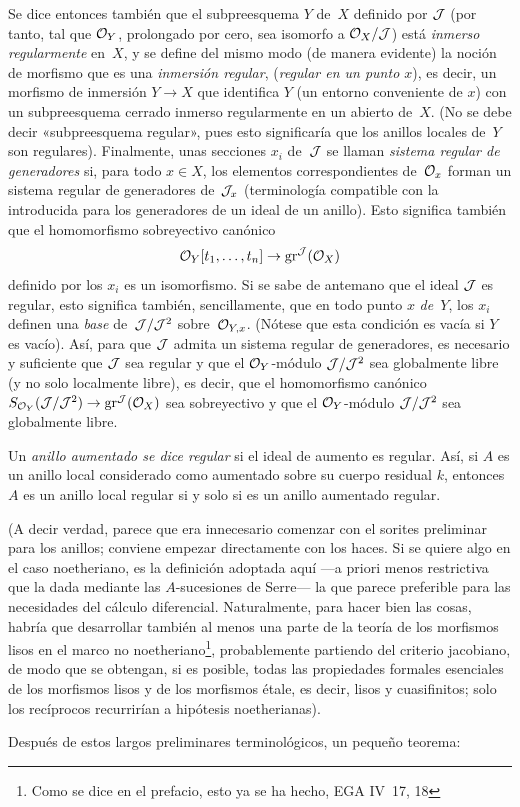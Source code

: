 \begin{remarques}
Se
dice entonces también que el subpreesquema $Y$ de~$X$ definido por $\cal{J}$ (por tanto, tal que $\cal{O}_Y$, prolongado por cero, sea isomorfo a $\cal{O}_X/\cal{J}$) está \emph{inmerso regularmente}
%
en~$X$, y se define del mismo modo (de manera evidente) la noción de morfismo que es una \emph{inmersión regular},
%
%
(\resp \emph{regular en un punto $x$}), es decir, un morfismo de inmersión $Y\to X$ que identifica $Y$ (\resp un entorno conveniente de $x$) con un subpreesquema cerrado inmerso regularmente en un abierto de~$X$. (No se debe decir «subpreesquema regular», pues esto significaría que los anillos locales de~$Y$ son regulares). Finalmente, unas secciones $x_i$ de~$\cal{J}$ se llaman \emph{sistema regular de generadores} si, para todo $x\in X$, los elementos correspondientes de~$\cal{O}_x$ forman un sistema regular de generadores de~$\cal{J}_x$ (terminología compatible con la introducida para los generadores de un ideal de un anillo). Esto significa también que el homomorfismo sobreyectivo canónico
\[
\cal{O}_Y[t_1,\dots,t_n]\to\gr^{\cal{J}}(\cal{O}_X)
\]
definido por los $x_i$ es un isomorfismo. Si se sabe de antemano que el ideal $\cal{J}$ es regular, esto significa también, sencillamente, que en todo punto $x$ \emph{de~$Y$}, los $x_i$ definen una \emph{base} de~$\cal{J}/\cal{J}^2$ sobre~$\cal{O}_{Y,x}$. (Nótese que esta condición es vacía si $Y$ es vacío). Así, para que $\cal{J}$ admita un sistema regular de generadores, es necesario y suficiente que $\cal{J}$ sea regular y que el $\cal{O}_Y$-módulo $\cal{J}/\cal{J}^2$ sea globalmente libre (y no solo localmente libre), es decir, que el homomorfismo canónico $S_{\cal{O}_Y}(\cal{J}/\cal{J}^2)\to\gr^{\cal{J}}(\cal{O}_X)$ sea sobreyectivo y que el $\cal{O}_Y$-módulo $\cal{J}/\cal{J}^2$ sea globalmente libre.

Un \emph{anillo aumentado se dice regular}
%
%
si el ideal de aumento es regular. Así, si $A$ es un anillo local considerado como aumentado sobre su cuerpo residual $k$, entonces $A$ es un anillo local regular si y solo si es un anillo aumentado regular.

(A decir verdad, parece que era innecesario comenzar con el sorites preliminar para los anillos; conviene empezar directamente con los haces. Si se quiere algo en el caso noetheriano, es la definición adoptada aquí ---a priori menos restrictiva que la dada mediante las $A$-sucesiones de Serre--- la que parece preferible para las necesidades del cálculo diferencial. Naturalmente, para hacer bien las cosas, habría que desarrollar también al menos una parte de la teoría de los morfismos lisos en el marco no noetheriano\footnote{Como se dice en el prefacio, esto ya se ha hecho, \cf EGA IV~17, 18}, probablemente
partiendo del criterio jacobiano, de modo que se obtengan, si es posible, todas las propiedades formales esenciales de los morfismos lisos y de los morfismos étale, es decir, lisos y cuasifinitos; solo los recíprocos recurrirían a hipótesis noetherianas).
\end{remarques}

Después de estos largos preliminares terminológicos, un pequeño teorema:
